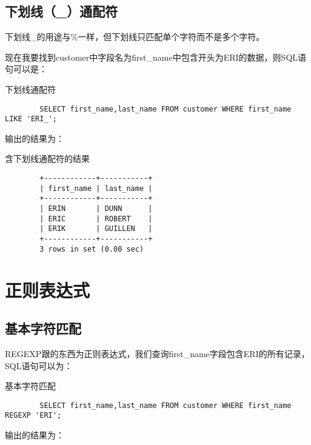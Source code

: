 \documentclass[UTF8]{article}
\begin{document}
\subsection{下划线（\_）通配符}
\begin{redbox}[frametitle={Defination 8.3 下划线（\_）通配符}]
        下划线\_的用途与\%一样，但下划线只匹配单个字符而不是多个字符。
\end{redbox}

现在我要找到customer中字段名为first\_name中包含开头为ERI的数据，则SQL语句可以是：
\begin{listing}[H]
	\caption{下划线通配符}
	\label{code:underlinewildcard}
\begin{verbatim}
        SELECT first_name,last_name FROM customer WHERE first_name LIKE 'ERI_';
\end{verbatim}
\end{listing}

输出的结果为：

\begin{listing}[H]
	\caption{含下划线通配符的结果}
	\label{code:underlinewildcardresult}
\begin{verbatim}
        +------------+-----------+
        | first_name | last_name |
        +------------+-----------+
        | ERIN       | DUNN      |
        | ERIC       | ROBERT    |
        | ERIK       | GUILLEN   |
        +------------+-----------+
        3 rows in set (0.00 sec)
\end{verbatim}
\end{listing}

\section{正则表达式}
\subsection{基本字符匹配}

REGEXP跟的东西为正则表达式，我们查询first\_name字段包含ERI的所有记录，SQL语句可以为：

\begin{listing}[H]
	\caption{基本字符匹配}
	\label{code:matchword}
\begin{verbatim}
        SELECT first_name,last_name FROM customer WHERE first_name REGEXP 'ERI';
\end{verbatim}
\end{listing}

输出的结果为：
\end{document}
